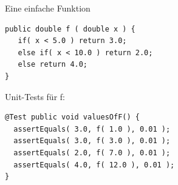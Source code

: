 \begin{frame}[t,fragile]{Eine einfache Funktion} %
\begin{lstlisting}
public double f ( double x ) {
   if( x < 5.0 ) return 3.0;
   else if( x < 10.0 ) return 2.0;
   else return 4.0;
}
\end{lstlisting}

\begin{minipage}[t]{3.5cm}
\end{minipage} 
\hfill
\begin{minipage}[t]{7cm}
Unit-Tests für f:

\begin{lstlisting}
@Test public void valuesOfF() {
  assertEquals( 3.0, f( 1.0 ), 0.01 );
  assertEquals( 3.0, f( 3.0 ), 0.01 );
  assertEquals( 2.0, f( 7.0 ), 0.01 );
  assertEquals( 4.0, f( 12.0 ), 0.01 );
}
\end{lstlisting}
\end{minipage}

\end{frame}

